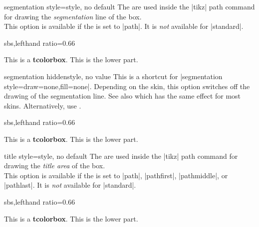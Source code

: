\clearpage
\begin{docTcbKey}{segmentation style}{=}{style, no default}
  The  are used inside the |tikz| path command
  for drawing the \emph{segmentation} line of the box.\\
  This option is available if the 
  is set to |path|.
  It is \emph{not} available for |standard|.
\begin{dispExample*}{sbs,lefthand ratio=0.66}

\begin{tcolorbox}[enhanced,title=My title,
  segmentation style={double=white,draw=blue,
                  double distance=1pt,solid}]
This is a \textbf{tcolorbox}.
\tcblower
This is the lower part.
\end{tcolorbox}
\end{dispExample*}
\end{docTcbKey}


\begin{docTcbKey}{segmentation hidden}{}{style, no value}
  This is a shortcut for |segmentation style={draw=none,fill=none}|.
  Depending on the skin, this option switches off the drawing of the
  segmentation line. See also  which
  has the same effect for most skins.
  Alternatively, use .
\begin{dispExample*}{sbs,lefthand ratio=0.66}

\begin{tcolorbox}[title=My title,
  enhanced,segmentation hidden]
This is a \textbf{tcolorbox}.
\tcblower
This is the lower part.
\end{tcolorbox}
\end{dispExample*}
\end{docTcbKey}


\begin{docTcbKey}{title style}{=}{style, no default}
  The  are used inside the |tikz| path command
  for drawing the \emph{title area} of the box.\\
  This option is available if the  is set to
  |path|, |pathfirst|, |pathmiddle|, or |pathlast|.
  It is \emph{not} available for |standard|.
\begin{dispExample*}{sbs,lefthand ratio=0.66}

\begin{tcolorbox}[enhanced,title=My title,
  title style={left color=blue!15!yellow,
               right color=red!85!black}]
This is a \textbf{tcolorbox}.
\tcblower
This is the lower part.
\end{tcolorbox}
\end{dispExample*}
\end{docTcbKey}

